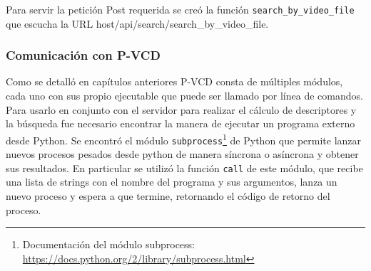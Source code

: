 Para servir la petición Post requerida se creó la función \texttt{search\_by\_video\_file} que escucha la URL host/api/search/search\_by\_video\_file.

\subsubsection*{Comunicación con P-VCD}
Como se detalló en capítulos anteriores P-VCD consta de múltiples módulos, cada uno con sus propio ejecutable que puede ser llamado por línea de comandos. Para usarlo en conjunto con el servidor para realizar el cálculo de descriptores y la búsqueda fue necesario encontrar la manera de ejecutar un programa externo desde Python.
Se encontró el módulo \texttt{subprocess}\footnote{Documentación del módulo subprocess: \url{https://docs.python.org/2/library/subprocess.html}} de Python que permite lanzar nuevos procesos pesados desde python de manera síncrona o asíncrona y obtener sus resultados. En particular se utilizó la función \texttt{call} de este módulo, que recibe una lista de strings con el nombre del programa y sus argumentos, lanza un nuevo proceso y espera a que termine, retornando el código de retorno del proceso.

